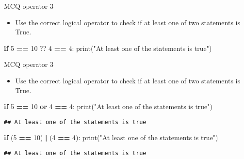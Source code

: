 \documentclass[
  8pt,
  ignorenonframetext,
]{beamer}
\newenvironment{Shaded}{\begin{snugshade}}{\end{snugshade}}
\newcommand{\BuiltInTok}[1]{#1}
\newcommand{\ControlFlowTok}[1]{\textcolor[rgb]{0.13,0.29,0.53}{\textbf{#1}}}
\newcommand{\DecValTok}[1]{\textcolor[rgb]{0.00,0.00,0.81}{#1}}
\newcommand{\KeywordTok}[1]{\textcolor[rgb]{0.13,0.29,0.53}{\textbf{#1}}}
\newcommand{\NormalTok}[1]{#1}
\newcommand{\OperatorTok}[1]{\textcolor[rgb]{0.81,0.36,0.00}{\textbf{#1}}}
\newcommand{\StringTok}[1]{\textcolor[rgb]{0.31,0.60,0.02}{#1}}
\providecommand{\tightlist}{%
  \setlength{\itemsep}{0pt}\setlength{\parskip}{0pt}}
\begin{document}
\begin{frame}[fragile]{MCQ operator 3}
\protect\hypertarget{mcq-operator-3}{}
\begin{itemize}
\tightlist
\item
  Use the correct logical operator to check if at least one of two
  statements is True.
\end{itemize}

\begin{Shaded}
\begin{Highlighting}[]
\ControlFlowTok{if} \DecValTok{5} \OperatorTok{==} \DecValTok{10}\NormalTok{ ?? }\DecValTok{4} \OperatorTok{==} \DecValTok{4}\NormalTok{:}
  \BuiltInTok{print}\NormalTok{(}\StringTok{"At least one of the statements is true"}\NormalTok{)}
\end{Highlighting}
\end{Shaded}
\end{frame}

\begin{frame}[fragile]{MCQ operator 3}
\protect\hypertarget{mcq-operator-3-1}{}
\begin{itemize}
\tightlist
\item
  Use the correct logical operator to check if at least one of two
  statements is True.
\end{itemize}

\begin{Shaded}
\begin{Highlighting}[]
\ControlFlowTok{if} \DecValTok{5} \OperatorTok{==} \DecValTok{10} \KeywordTok{or} \DecValTok{4} \OperatorTok{==} \DecValTok{4}\NormalTok{:}
  \BuiltInTok{print}\NormalTok{(}\StringTok{"At least one of the statements is true"}\NormalTok{)}
\end{Highlighting}
\end{Shaded}

\begin{verbatim}
## At least one of the statements is true
\end{verbatim}

\begin{Shaded}
\begin{Highlighting}[]
  
\ControlFlowTok{if}\NormalTok{ (}\DecValTok{5} \OperatorTok{==} \DecValTok{10}\NormalTok{) }\OperatorTok{|}\NormalTok{ (}\DecValTok{4} \OperatorTok{==} \DecValTok{4}\NormalTok{):}
  \BuiltInTok{print}\NormalTok{(}\StringTok{"At least one of the statements is true"}\NormalTok{)}
\end{Highlighting}
\end{Shaded}

\begin{verbatim}
## At least one of the statements is true
\end{verbatim}
\end{frame}
\end{document}
